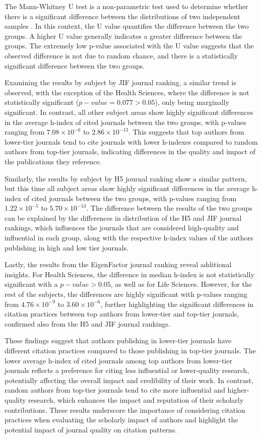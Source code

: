 The Mann-Whitney U test is a non-parametric test used to determine whether
there is a significant difference between the distributions of two independent
samples \cite{mann1947test}. In this context, the U value quantifies the
difference between the two groups. A higher U value generally indicates a
greater difference between the groups. The extremely low p-value associated
with the U value suggests that the observed difference is not due to random
chance, and there is a statistically significant difference between the two
groups.

Examining the results by subject by JIF journal ranking, a similar trend is
observed, with the exception of the Health Sciences, where the difference is
not statistically significant ($p-value = 0.077 > 0.05$), only being marginally
significant. In contrast, all other subject areas show highly significant
differences in the average h-index of cited journals between the two groups,
with p-values ranging from $7.08 \times 10^{-6}$ to $2.86 \times 10^{-13}$.
This suggests that top authors from lower-tier journals tend to cite journals
with lower h-indexes compared to random authors from top-tier journals,
indicating differences in the quality and impact of the publications they
reference.

Similarly, the results by subject by H5 journal ranking show a similar pattern,
but this time all subject areas show highly significant differences in the
average h-index of cited journals between the two groups, with p-values ranging
from $1.22 \times 10^{-5}$ to $5.70 \times 10^{-13}$. The difference between
the results of the two groups can be explained by the differences in
distribution of the H5 and JIF journal rankings, which influences the journals
that are considered high-quality and influential in each group, along with the
respective h-index values of the authors publishing in high and low tier
journals.

Lastly, the results from the EigenFactor journal ranking reveal additional
insights. For Health Sciences, the difference in median h-index is not
statistically significant with a $p-value > 0.05$, as well as for Life
Sciences. However, for the rest of the subjects, the differences are highly
significant with p-values ranging from $4.76 \times 10^{-9}$ to $3.60 \times
    10^{-6}$, further highlighting the significant differences in citation
practices between top authors from lower-tier and top-tier journals, confirmed
also from the H5 and JIF journal rankings.

These findings suggest that authors publishing in lower-tier journals have
different citation practices compared to those publishing in top-tier journals.
The lower average h-index of cited journals among top authors from lower-tier
journals reflects a preference for citing less influential or lower-quality
research, potentially affecting the overall impact and credibility of their
work. In contrast, random authors from top-tier journals tend to cite more
influential and higher-quality research, which enhances the impact and
reputation of their scholarly contributions. These results underscore the
importance of considering citation practices when evaluating the scholarly
impact of authors and highlight the potential impact of journal quality on
citation patterns.

